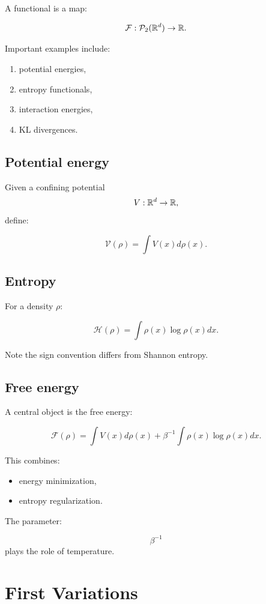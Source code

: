 A functional is a map:

\[
\mathcal F : \mathcal{P}_2(\mathbb{R}^d) \to \mathbb{R}.
\]

Important examples include:

\begin{enumerate}[label=(\alph*)]
    \item potential energies,
    \item entropy functionals,
    \item interaction energies,
    \item KL divergences.
\end{enumerate}

\subsection{Potential energy}

Given a confining potential
\[
V : \mathbb{R}^d \to \mathbb{R},
\]
define:

\[
\mathcal V(\rho)
=
\int V(x)d\rho(x).
\]

\subsection{Entropy}

For a density $\rho$:

\[
\mathcal H(\rho)
=
\int \rho(x)\log \rho(x)dx.
\]

Note the sign convention differs from Shannon entropy.

\subsection{Free energy}

A central object is the free energy:

\[
\mathcal F(\rho)
=
\int V(x)d\rho(x)
+
\beta^{-1}
\int \rho(x)\log \rho(x)dx.
\]

This combines:

\begin{itemize}
    \item energy minimization,
    \item entropy regularization.
\end{itemize}

The parameter:

\[
\beta^{-1}
\]
plays the role of temperature.

\section{First Variations}

